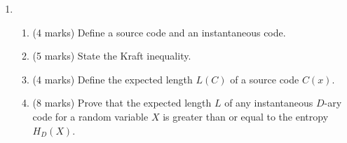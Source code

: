 \documentclass[12pt]{article}
\begin{document}
\begin{enumerate}
\item %
\begin{enumerate}
\item (4 marks) Define a source code and an instantaneous code.
\item (5 marks) State the Kraft inequality.
\item (4 marks) Define the expected length $L(C)$ of a source code $C(x)$.
\item (8 marks) Prove that the expected length $L$ of any instantaneous $D$-ary code for a random variable $X$ is greater than or equal to the entropy $H_D(X)$.
\end{enumerate}
\end{enumerate}




\end{document}
